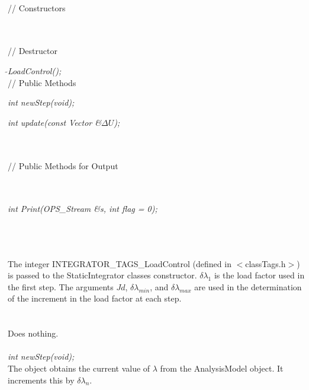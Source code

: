 \\
// Constructors 

\\ \\
// Destructor 

{\em $\tilde{ }$LoadControl();}\\  

// Public Methods 

{\em int newStep(void);} 

{\em int update(const Vector \&$\Delta U$);} 

 \\ \\
// Public Methods for Output

\\ 
\\ 
{\em int Print(OPS_Stream \&s, int flag = 0);}


 \\
\\ \\
The integer INTEGRATOR\_TAGS\_LoadControl (defined in
$<$classTags.h$>$) is passed to the StaticIntegrator classes
constructor. $\delta \lambda_1$ is the load factor used in the first
step. The arguments $Jd$, $\delta \lambda_{min}$, and $\delta
\lambda_{max}$ are used in the determination of the increment in the
load factor at each step. \\



 \\
\\ 
Does nothing. \\

\\

{\em int newStep(void);} \\
The object obtains the current value of $\lambda$ from the AnalysisModel
object. It increments this by $\delta \lambda_n $.

